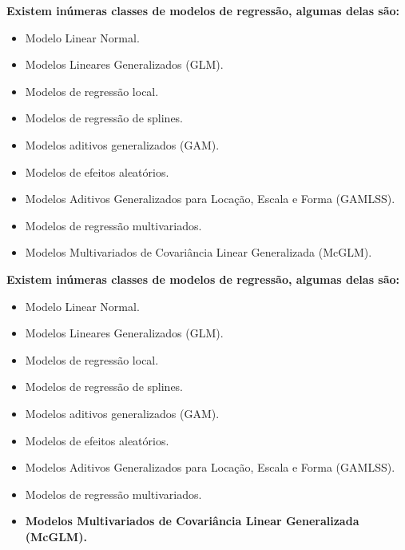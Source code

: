 \documentclass[10pt,
  aspectratio=169,
  serif,
  mathserif,
  professionalfont,
  compress,
  handout,
  ]{beamer}\usepackage[]{graphicx}\usepackage[]{color}
\begin{document}
\begin{frame}[c, allowframebreaks]

\textbf{Existem inúmeras classes de modelos de regressão, algumas delas são:}

\begin{itemize}
 \item Modelo Linear Normal.
 \item Modelos Lineares Generalizados (GLM).
 \item Modelos de regressão local.
 \item Modelos de regressão de splines.
 \item Modelos aditivos generalizados (GAM).
 \item Modelos de efeitos aleatórios.
 \item Modelos Aditivos Generalizados para Locação, Escala e Forma (GAMLSS).
 \item Modelos de regressão multivariados.
 \item Modelos Multivariados de Covariância Linear Generalizada (McGLM).
\end{itemize}

\end{frame}

\begin{frame}[c, allowframebreaks]

\textbf{Existem inúmeras classes de modelos de regressão, algumas delas são:}

\begin{itemize}
 \item Modelo Linear Normal.
 \item Modelos Lineares Generalizados (GLM).
 \item Modelos de regressão local.
 \item Modelos de regressão de splines.
 \item Modelos aditivos generalizados (GAM).
 \item Modelos de efeitos aleatórios.
 \item Modelos Aditivos Generalizados para Locação, Escala e Forma (GAMLSS).
 \item Modelos de regressão multivariados.
 \item\textbf{ Modelos Multivariados de Covariância Linear Generalizada (McGLM).}
\end{itemize}

\end{frame}

\end{document}

